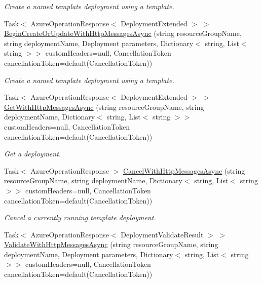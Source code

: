 \begin{DoxyCompactItemize}
\begin{DoxyCompactList}\small\item\em Create a named template deployment using a template. \end{DoxyCompactList}\item 
Task$<$ Azure\+Operation\+Response$<$ Deployment\+Extended $>$ $>$ \hyperlink{interface_microsoft_1_1_azure_1_1_management_1_1_resources_1_1_i_deployments_operations_a7e7bd5ff46eaf9e224b197ad45925f11}{Begin\+Create\+Or\+Update\+With\+Http\+Messages\+Async} (string resource\+Group\+Name, string deployment\+Name, Deployment parameters, Dictionary$<$ string, List$<$ string $>$$>$ custom\+Headers=null, Cancellation\+Token cancellation\+Token=default(Cancellation\+Token))
\begin{DoxyCompactList}\small\item\em Create a named template deployment using a template. \end{DoxyCompactList}\item 
Task$<$ Azure\+Operation\+Response$<$ Deployment\+Extended $>$ $>$ \hyperlink{interface_microsoft_1_1_azure_1_1_management_1_1_resources_1_1_i_deployments_operations_a3e1f85b3b65f1409d1562160693ff1ed}{Get\+With\+Http\+Messages\+Async} (string resource\+Group\+Name, string deployment\+Name, Dictionary$<$ string, List$<$ string $>$$>$ custom\+Headers=null, Cancellation\+Token cancellation\+Token=default(Cancellation\+Token))
\begin{DoxyCompactList}\small\item\em Get a deployment. \end{DoxyCompactList}\item 
Task$<$ Azure\+Operation\+Response $>$ \hyperlink{interface_microsoft_1_1_azure_1_1_management_1_1_resources_1_1_i_deployments_operations_aba50ee2e15688eb10a33236b52812969}{Cancel\+With\+Http\+Messages\+Async} (string resource\+Group\+Name, string deployment\+Name, Dictionary$<$ string, List$<$ string $>$$>$ custom\+Headers=null, Cancellation\+Token cancellation\+Token=default(Cancellation\+Token))
\begin{DoxyCompactList}\small\item\em Cancel a currently running template deployment. \end{DoxyCompactList}\item 
Task$<$ Azure\+Operation\+Response$<$ Deployment\+Validate\+Result $>$ $>$ \hyperlink{interface_microsoft_1_1_azure_1_1_management_1_1_resources_1_1_i_deployments_operations_a768f02de88ae476438aedb2716df10d6}{Validate\+With\+Http\+Messages\+Async} (string resource\+Group\+Name, string deployment\+Name, Deployment parameters, Dictionary$<$ string, List$<$ string $>$$>$ custom\+Headers=null, Cancellation\+Token cancellation\+Token=default(Cancellation\+Token))

\end{DoxyCompactItemize}
